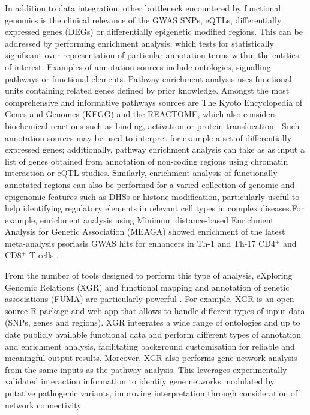 In addition to data integration, other bottleneck encountered by functional genomics is the clinical relevance of the GWAS SNPs, eQTLs, differentially expressed genes (DEGs) or differentially epigenetic modified regions. This can be addressed by performing enrichment analysis, which tests for statistically significant over-representation of particular annotation terms within the entities of interest. Examples of annotation sources include ontologies, signalling pathways or functional elements. Pathway enrichment analysis uses functional units containing related genes defined by prior knowledge. Amongst the most comprehensive and informative pathways sources are The Kyoto Encyclopedia of Genes and Genomes (KEGG) and the REACTOME, which also considers biochemical reactions such as binding, activation or protein translocation \parencite{Kanehisa2000}. Such annotation sources may be used to interpret for example a set of differentially expressed genes; additionally, pathway enrichment analysis can take as as input a list of genes obtained from annotation of non-coding regions using chromatin interaction or eQTL studies. Similarly, enrichment analysis of functionally annotated regions can also be performed for a varied collection of genomic and epigenomic features such as DHSs or histone modification, particularly useful to help identifying regulatory elements in relevant cell types in complex diseases.For example, enrichment analysis using Minimum distance-based Enrichment Analysis for Genetic Association (MEAGA) showed enrichment of the latest meta-analysis psoriasis GWAS hits for enhancers in Th-1 and Th-17 CD4$^+$ and CD8$^+$ T cells \parencite{Tsoi2017}.

From the number of tools designed to perform this type of analysis, eXploring Genomic Relations (XGR) and functional mapping and annotation of genetic associations (FUMA) are particularly powerful \parencite{Fang2016,Watanabe2017}. For example, XGR is an open source R package and web-app that allows to handle different types of input data (SNPs, genes and regions). XGR integrates a wide range of ontologies and up to date publicly available functional data and perform different types of annotation and enrichment analysis, facilitating background customisation for reliable and meaningful output results. Moreover, XGR also performs gene network analysis from the same inputs as the pathway analysis. This leverages experimentally validated interaction information to identify gene networks modulated by putative pathogenic variants, improving interpretation through consideration of network connectivity.

